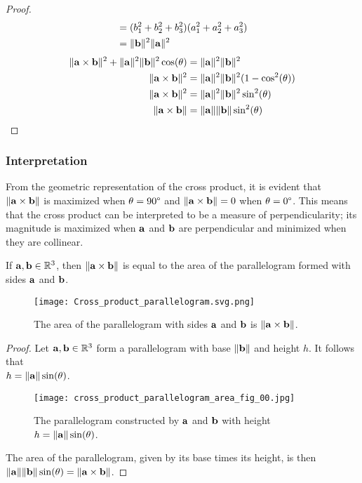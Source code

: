\documentclass[../main.tex]{subfiles}
\begin{document}
\begin{proof}
\begin{align*}
		                                                                       & =(b_1^2+b_2^2+b_3^2)(a_1^2+a_2^2+a_3^2)                                                    \\
		                                                                       & =\|\mathbf{b}\|^2\|\mathbf{a}\|^2
	\end{align*}
	\begin{align*}
		\|\mathbf{a}\times\mathbf{b}\|^2+\|\mathbf{a}\|^2\|\mathbf{b}\|^2\cos (\theta) & =\|\mathbf{a}\|^2\|\mathbf{b}\|^2                    \\
		\|\mathbf{a}\times\mathbf{b}\|^2                                           & =\|\mathbf{a}\|^2\|\mathbf{b}\|^2(1-\cos^2 (\theta)) \\
		\|\mathbf{a}\times\mathbf{b}\|^2                                           & =\|\mathbf{a}\|^2\|\mathbf{b}\|^2\sin^2 (\theta)     \\
		\|\mathbf{a}\times\mathbf{b}\|                                             & =\|\mathbf{a}\|\|\mathbf{b}\|\sin^2 (\theta)
	\end{align*}
\end{proof}

\subsubsection{Interpretation}

From the geometric representation of the cross product, it is evident that
$\|\mathbf{a}\times\mathbf{b}\|$ is maximized when $\theta=90\degree$ and $\|\mathbf{a}\times\mathbf{b}\|=0$
when $\theta=0\degree$. This means that the cross product can be interpreted to be
a measure of perpendicularity; its magnitude is maximized when $\mathbf{a}$ and $\mathbf{b}$
are perpendicular and minimized when they are collinear.

\begin{theorem}
	If $\mathbf{a}, \mathbf{b} \in \mathbb{R}^3$, then $\|\mathbf{a}\times\mathbf{b}\|$
	is equal to the area of the parallelogram formed with sides $\mathbf{a}$ and $\mathbf{b}$.
\end{theorem}

\begin{figure}[H]
	\centering
	\texttt{[image: Cross\_product\_parallelogram.svg.png]}
	\caption{The area of the parallelogram with sides $\mathbf{a}$ and $\mathbf{b}$ is $\|\mathbf{a}\times\mathbf{b}\|$.}
\end{figure}

\begin{proof}
	Let $\mathbf{a}, \mathbf{b} \in \mathbb{R}^3$ form a parallelogram with
	base $\|\mathbf{b}\|$ and height $h$. It follows that\\
	$h=\|\mathbf{a}\|\sin (\theta)$.
	\begin{figure}[H]
		\centering
		\texttt{[image: cross\_product\_parallelogram\_area\_fig\_00.jpg]}
		\caption{The parallelogram constructed by $\mathbf{a}$ and $\mathbf{b}$ with height $h=\|\mathbf{a}\|\sin (\theta)$.}
	\end{figure}
	The area of the parallelogram, given by its base times its height,
	is then $\|\mathbf{a}\|\|\mathbf{b}\|\sin (\theta)=\|\mathbf{a}\times\mathbf{b}\|$.
\end{proof}
\end{document}
